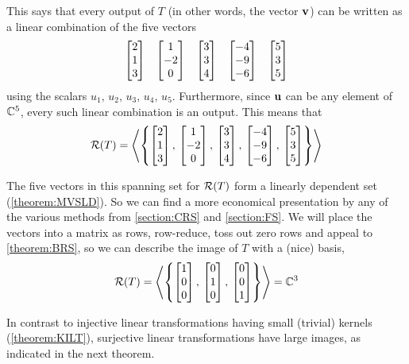 \documentclass{ximera}
\begin{document}
\begin{example}
This says that every output of $T$ (in other words, the vector $\mathbf{v}$) can be written as a linear combination of the five vectors
\begin{align*}
\begin{bmatrix}2\\1\\3\end{bmatrix}&&
\begin{bmatrix}1\\-2\\0\end{bmatrix}&&
\begin{bmatrix}3\\3\\4\end{bmatrix}&&
\begin{bmatrix}-4\\-9\\-6\end{bmatrix}&&
\begin{bmatrix}5\\3\\5\end{bmatrix}
\end{align*}
using the scalars $u_1,\,u_2,\,u_3,\,u_4,\,u_5$.  Furthermore, since $\mathbf{u}$ can be any element of $\mathbb{C}^{5}$, every such linear combination is an output.  This means that
\[
\mathcal{R}\!\left(T\right)=\left\langle\left\{
\begin{bmatrix}2\\1\\3\end{bmatrix},\,
\begin{bmatrix}1\\-2\\0\end{bmatrix},\,
\begin{bmatrix}3\\3\\4\end{bmatrix},\,
\begin{bmatrix}-4\\-9\\-6\end{bmatrix},\,
\begin{bmatrix}5\\3\\5\end{bmatrix}
\right\}\right\rangle
\]


The five vectors in this spanning set for $\mathcal{R}\!\left(T\right)$ form a linearly dependent set (\ref{theorem:MVSLD}).  So we can find a more economical presentation by any of the various methods from \ref{section:CRS} and \ref{section:FS}.  We will place the vectors into a matrix as rows, row-reduce, toss out zero rows and appeal to \ref{theorem:BRS}, so we can describe the image of $T$ with a (nice) basis,
\[
\mathcal{R}\!\left(T\right)=\left\langle\left\{
\begin{bmatrix}1\\0\\0\end{bmatrix},\,\begin{bmatrix}0\\1\\0\end{bmatrix},\,\begin{bmatrix}0\\0\\1\end{bmatrix}
\right\}\right\rangle = \mathbb{C}^{3}\]

\end{example}

In contrast to injective linear transformations having small (trivial) kernels (\ref{theorem:KILT}), surjective linear transformations have large images, as indicated in the next theorem.
\end{document}
